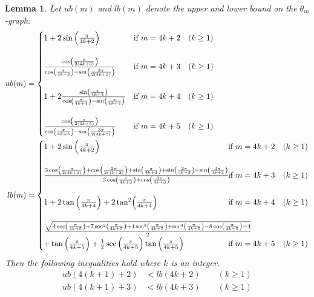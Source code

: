 \documentclass[12pt]{article}
\newtheorem{lem}[defin]{Lemma}
\newenvironment{lemma}{\begin{lem} \sl}{\end{lem}}
\begin{document}
\begin{lemma}
  \label{proposition inequalities}
  Let $ub(m)$ and $lb(m)$ denote the upper and lower bound on the $\theta_m$-graph: 
  \begin{align*}
    ub(m) &=
    \begin{cases}
    1 + 2 \sin\left(\frac{\pi}{4k+2}\right) & \textrm{if }m=4k+2\quad(k\geq 1)\cr
    &\cr
    \frac{\cos\left(\frac{\pi}{2(4k+3)}\right)}{\cos\left(\frac{\pi}{4k+3}\right) - \sin\left(\frac{3\pi}{2(4k+3)}\right)} & \textrm{if }m=4k+3\quad(k\geq 1)\cr
    &\cr
    1 + 2 \frac{\sin\left(\frac{\pi}{4k+4}\right)}{\cos\left(\frac{\pi}{4k+4}\right) - \sin\left(\frac{\pi}{4k+4}\right)} & \textrm{if }m=4k+4\quad(k\geq 1)\cr
    &\cr
    \frac{\cos\left(\frac{\pi}{2(4k+5)}\right)}{\cos\left(\frac{\pi}{4k+5}\right) - \sin\left(\frac{3\pi}{2(4k+5)}\right)} & \textrm{if }m=4k+5\quad(k\geq 1)\cr
    \end{cases}\\
    lb(m) &=
    \begin{cases}
    1 + 2 \sin\left(\frac{\pi}{4k+2}\right) & \textrm{\hspace{-1.5cm} if }m=4k+2\quad(k\geq 1)\cr
    &\cr
    \frac{3\cos\left(\frac{\pi}{2(4k+3)}\right)+\cos\left(\frac{3\pi}{2(4k+3)}\right)+\sin\left(\frac{\pi}{4k+3}\right)+\sin\left(\frac{2\pi}{4k+3}\right)+\sin\left(\frac{3\pi}{4k+3}\right)}{3\cos\left(\frac{\pi }{4k+3}\right)+\cos\left(\frac{3\pi }{4k+3}\right)} & \textrm{\hspace{-1.5cm} if }m=4k+3\quad(k\geq 1)\cr
    &\cr
    1+2\tan\left(\frac{\pi}{4k+4}\right)+2\tan^2\!\left(\frac{\pi}{4k+4}\right) & \textrm{\hspace{-1.5cm} if }m=4k+4\quad(k\geq 1)\cr
    &\cr
    \frac{\sqrt{4\sec\left(\frac{\pi}{4k+5}\right) + 7\sec^2\left(\frac{\pi}{4k+5}\right) + 4\sec^3\left(\frac{\pi}{4k+5}\right) + \sec^4\left(\frac{\pi}{4k+5}\right) - 8\cos\left(\frac{\pi}{4k+5}\right) - 4}}{2}  \cr +  \tan\left(\frac{\pi}{4k+5}\right) + \frac{1}{2}\sec\left(\frac{\pi}{4k+5}\right)\tan\left(\frac{\pi}{4k+5}\right) & \textrm{\hspace{-1.5cm} if }m=4k+5\quad(k\geq 1)\cr
    \end{cases}
  \end{align*}
  Then the following inequalities hold where $k$ is an integer.
  \begin{align}
    \label{4k+2 monotonic}
    ub(4(k+1)+2) &< lb(4k+2) \qquad (k \geq 1) \\
    \label{4k+3 monotonic}
    ub(4(k+1)+3) &< lb(4k+3) \qquad (k \geq 1) \\

\end{align}
\end{lemma}
\end{document}
